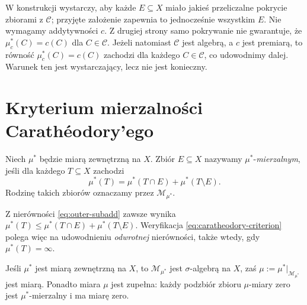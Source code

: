 \begin{uwaga}
W konstrukcji wystarczy, aby każde $E\subseteq X$ miało jakieś
przeliczalne pokrycie zbiorami z $\mathcal C$; przyjęte założenie
zapewnia to jednocześnie wszystkim $E$. Nie wymagamy addytywności $c$.
Z drugiej strony samo pokrywanie nie gwarantuje, że
$\mu_c^*(C)=c(C)$ dla $C\in\mathcal C$.
Jeżeli natomiast $\mathcal C$ jest algebrą, a $c$ jest premiarą,
to równość $\mu_c^*(C)=c(C)$ zachodzi dla każdego
$C\in\mathcal C$, co udowodnimy dalej. Warunek ten jest
wystarczający, lecz nie jest konieczny.
\end{uwaga}

\section{Kryterium mierzalności Carathéodory'ego}

\begin{definicja}
\label{def:caratheodory-measurable}
Niech $\mu^*$ będzie miarą zewnętrzną na $X$. Zbiór $E\subseteq X$
nazywamy $\mu^*$-\emph{mierzalnym}, jeśli dla każdego $T\subseteq X$
zachodzi
\begin{equation}\label{eq:caratheodory-criterion}
\mu^*(T)=\mu^*(T\cap E)+\mu^*(T\setminus E).
\end{equation}
Rodzinę takich zbiorów oznaczamy przez $\mathcal M_{\mu^*}$.
\end{definicja}

Z nierówności \eqref{eq:outer-subadd} zawsze wynika
$\mu^*(T)\le\mu^*(T\cap E)+\mu^*(T\setminus E)$.
Weryfikacja \eqref{eq:caratheodory-criterion} polega więc na
udowodnieniu \emph{odwrotnej} nierówności, także wtedy, gdy
$\mu^*(T)=\infty$.

\begin{twierdzenie}
\label{thm:caratheodory}
Jeśli $\mu^*$ jest miarą zewnętrzną na $X$, to
$\mathcal M_{\mu^*}$ jest $\sigma$-algebrą na $X$, zaś
$\mu:=\mu^*|_{\mathcal M_{\mu^*}}$ jest miarą. Ponadto miara
$\mu$ jest zupełna: każdy podzbiór zbioru $\mu$-miary zero jest
$\mu^*$-mierzalny i ma miarę zero.
\end{twierdzenie}

